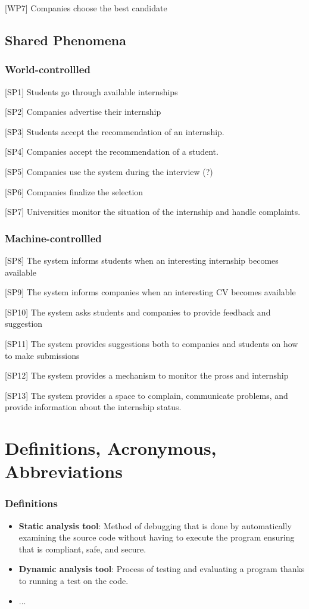 [WP7] Companies choose the best candidate

\subsection{Shared Phenomena}

\subsubsection{World-controllled}
[SP1] Students go through available internships

[SP2] Companies advertise their internship

[SP3] Students accept the recommendation of an internship.

[SP4] Companies accept the recommendation of a student. 

[SP5] Companies use the system during the interview (?)

[SP6] Companies finalize the selection

[SP7] Universities monitor the situation of the internship and handle complaints.


\subsubsection{Machine-controllled}
[SP8] The system informs students when an interesting internship becomes available

[SP9] The system informs companies when an interesting CV becomes available

[SP10] The system asks students and companies to provide feedback and suggestion

[SP11] The system provides suggestions both to companies and students on how to make submissions

[SP12] The system provides a mechanism to monitor the pross and internship

[SP13] The system provides a space to complain, communicate problems, and provide information about the internship status.

\section{Definitions, Acronymous, Abbreviations}
\subsubsection{Definitions}
\begin{itemize}
    \item \textbf{Static analysis tool}: Method of debugging that is done by automatically examining the source code without having to execute the program ensuring that is compliant, safe, and secure.
    \item \textbf{Dynamic analysis tool}: Process of testing and evaluating a program thanks to running a test on the code.

    \item ...
\end{itemize}

